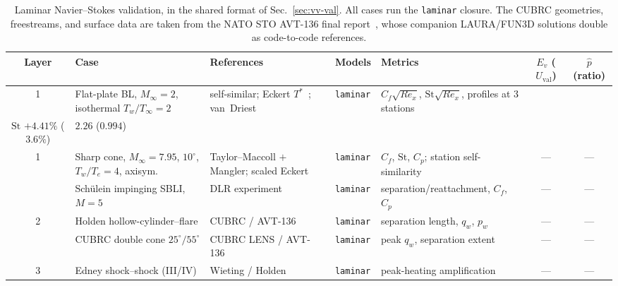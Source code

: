 \documentclass[journal,biblatex]{new-aiaa}
\newcommand{\Field}[1]{\texttt{#1}}
\begin{document}
\begin{table}[H]
\centering\scriptsize\setlength{\tabcolsep}{3.5pt}
\caption{Laminar Navier--Stokes validation, in the shared format of
Sec.~\ref{sec:vv-val}. All cases run the \Field{laminar} closure. The CUBRC
geometries, freestreams, and surface data are taken from the NATO STO AVT-136
final report~\cite{research_and_technology_organization_assessment_2011}, whose
companion LAURA/FUN3D solutions double as code-to-code references.}
\label{tab:val-laminar}
\begin{tabularx}{\linewidth}{@{}c >{\raggedright\arraybackslash}p{2.4cm} >{\raggedright\arraybackslash}p{1.9cm} >{\raggedright\arraybackslash}p{1.35cm} X c c@{}}
\toprule
Layer & Case & References & Models & Metrics & $E_v$ ($U_{\mathrm{val}}$) & $\hat p$ (ratio) \\
\midrule
1 & Flat-plate BL, $M_\infty{=}2$, isothermal $T_w/T_\infty{=}2$ & self-similar; Eckert $T^*$~\cite{eckert_engineering_2022}; van~Driest~\cite{van_driest_investigation_1952} & \Field{laminar} & $C_f\sqrt{Re_x}$, $\mathrm{St}\sqrt{Re_x}$, profiles at 3 stations & \begin{tabular}[t]{@{}l@{}}$C_f$ $+2.55\%$ ($2.0\%$)\\ $\mathrm{St}$ $+4.41\%$ ($3.6\%$)\end{tabular} & $2.26$ ($0.994$) \\
1 & Sharp cone, $M_\infty{=}7.95$, $10^\circ$, $T_w/T_e{=}4$, axisym. & Taylor--Maccoll $+$ Mangler; scaled Eckert~\cite{eckert_engineering_2022} & \Field{laminar} & $C_f$, $\mathrm{St}$, $C_p$; station self-similarity & --- & --- \\
\addlinespace
2 & Sch\"ulein impinging SBLI, $M{=}5$ & DLR experiment~\cite{schulein_skin_2006} & \Field{laminar} & separation/reattachment, $C_f$, $C_p$ & --- & --- \\
2 & Holden hollow-cylinder--flare & CUBRC / AVT-136~\cite{research_and_technology_organization_assessment_2011} & \Field{laminar} & separation length, $q_w$, $p_w$ & --- & --- \\
\addlinespace
3 & CUBRC double cone $25^\circ/55^\circ$ & CUBRC LENS / AVT-136~\cite{research_and_technology_organization_assessment_2011} & \Field{laminar} & peak $q_w$, separation extent & --- & --- \\
3 & Edney shock--shock (III/IV) & Wieting / Holden & \Field{laminar} & peak-heating amplification & --- & --- \\
\bottomrule
\end{tabularx}
\end{table}
\end{document}
